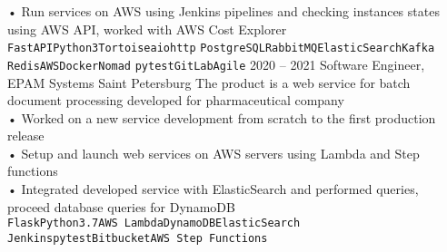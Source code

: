 {\begin{entrylist}
{            • Run services on AWS using Jenkins pipelines and checking instances states using AWS API, worked with AWS Cost Explorer \\
			\texttt{FastAPI}\slashsep\texttt{Python3}\slashsep\texttt{Tortoise}\slashsep\texttt{aiohttp}\slashsep
			\texttt{PostgreSQL}\slashsep\texttt{RabbitMQ}\slashsep\texttt{ElasticSearch}\slashsep\texttt{Kafka}
			\slashsep\texttt{Redis}\slashsep\texttt{AWS}\slashsep\texttt{Docker}\slashsep\texttt{Nomad}\slashsep
			\texttt{pytest}\slashsep\texttt{GitLab}\slashsep\texttt{Agile}
		}
		\entry
		{2020 – 2021}
		{Software Engineer, EPAM Systems}
		{Saint Petersburg}
		{
		    The product is a web service for batch document processing developed for pharmaceutical company \\
			• Worked on a new service development from scratch to the first production release \\
            • Setup and launch web services on AWS servers using Lambda and Step functions \\
            • Integrated developed service with ElasticSearch and performed queries, proceed database queries for DynamoDB \\
			\texttt{Flask}\slashsep\texttt{Python3.7}\slashsep\texttt{AWS Lambda}\slashsep\texttt{DynamoDB}\slashsep\texttt{ElasticSearch}\\
			\texttt{Jenkins}\slashsep\texttt{pytest}\slashsep\texttt{Bitbucket}\slashsep\texttt{AWS Step Functions}
		}
	\end{entrylist}
}

\newcommand{\cvtemplateeducation}{Education}
\newcommand{\cveducation}{
	\begin{entrylist}
	    \entry
		{2018}
		{Python course, EPAM Systems}
		{Saint Petersburg}
		{
			During the course, all main Python topics have been learnt and put into practice.
			Developed a web service for getting some statistics from external API and displaying it in graphs view.\\
			\texttt{Python3}\slashsep\texttt{Flask}
		}
		\entry
		{2014 – 2020}
		{Bachelor/Master's Degrees in Software Engineering, ITMO University}
		{Saint Petersburg}
		{
			The final project was a web service for saving educational results based on Blockchain technology.\\
			\texttt{Python3}\slashsep\texttt{Django}\slashsep\texttt{SQLite}
		}
	\end{entrylist}
}

\newcommand{\cvtemplatecontacts}{Contacts}
\newcommand{\cvcontacts}{
	\icontext{At}{12}{\href{mailto:valeriiashestakova@gmail.com}{valeriiashestakova@gmail.com}}\\
	\icontext{Linkedin}{12}{\href{https://www.linkedin.com/in/lerushe/}{@lerushe}}\\
}
\newcommand{\cvtemplatelanguages}{Languages}
\newcommand{\cvlanguages}{
	\bubbles{
    	5/Russian,
    	4/English
	}{}
}
